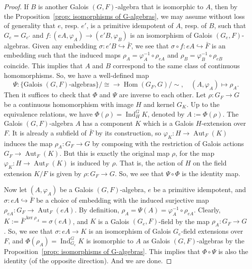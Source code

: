 \documentclass[10pt,a4paper]{amsart}
\begin{document}
\begin{proof}
		If $B$ is another Galois $(G,F)$-algebra that is isomorphic to $A$, then by the Proposition~\ref{prop: isomorphisms of G-algebras}, we may assume without loss of generality that $e$, resp. $e'$, is a primitive idempotent of $A$, resp. of $B$, such that $G_e=G_{e'}$ and $f:(eA,\varphi_{A})\to(e'B,\varphi_{B})$ is an isomorphism of Galois $(G_e,F)$-algebras.
		Given any embedding $\sigma:e'B\hookrightarrow\bar{F}$, we see that $\sigma\circ f:eA\hookrightarrow\bar{F}$ is an embedding such that the induced maps $\rho_A=\varphi_A^{-1}\circ\rho_{eA}$ and $\rho_B=\varphi_B^{-1}\circ\rho_{eB}$ coincide.
		This implies that $A$ and $B$ correspond to the same class of continuous homomorphisms.
		So, we have a well-defined map
		\begin{equation*}
			\Psi:\{\text{Galois }(G,F)\text{-algebras}\}/\cong\to\operatorname{Hom}(G_F,G)/\sim,\quad(A,\varphi_A)\mapsto\rho_A.
		\end{equation*}
		Then it suffices to check that $\Phi$ and $\Psi$ are inverse to each other.
		Let $\rho:G_F\to G$ be a continuous homomorphism with image $H$ and kernel $G_K$.
		Up to the equivalence relations, we have $\Phi(\rho)=\operatorname{Ind}^G_H K$, denoted by $A:=\Phi(\rho)$.
		The Galois $(G,F)$-algebra $A$ has a component $K$ which is a Galois $H$-extension over $F$.
		It is already a subfield of $\bar{F}$ by its construction, so $\varphi_K:H\to\operatorname{Aut}_F(K)$ induces the map $\rho_A:G_F\to G$ by composing with the restriction of Galois actions $G_F\to\operatorname{Aut}_F(K)$.
		But this is exactly the original map $\rho$, for the map $\varphi_K:H\to\operatorname{Aut}_F(K)$ is induced by $\rho$.
		That is, the action of $H$ on the field extension $K/F$ is given by $\rho:G_F\to G$.
		So, we see that $\Psi\circ\Phi$ is the identity map.
		
		Now let $(A,\varphi_A)$ be a Galois $(G,F)$-algebra, $e$ be a primitive idempotent, and $\sigma:eA\hookrightarrow\bar{F}$ be a choice of embedding with the induced surjective map $\rho_{eA}:G_F\to\operatorname{Aut}_F(eA)$.
		By definition, $\rho_A=\Psi(A)=\varphi_A^{-1}\circ\rho_{eA}$.
		Clearly, $K:=\bar{F}^{\ker\rho_A}=\sigma(eA)$, and $K$ is a Galois $(G_e,F)$-field by the map $\rho_A:G_F\to G$.
		So, we see that $\sigma:eA\to K$ is an isomorphism of Galois $G_e$-field extensions over $F$, and $\Phi(\rho_A)=\operatorname{Ind}^G_{G_e}K$ is isomorphic to $A$ as Galois $(G,F)$-algebras by the Proposition~\ref{prop: isomorphisms of G-algebras}.
		This implies that $\Phi\circ\Psi$ is also the identity (of the opposite direction).
		And we are done.
	\end{proof}
\end{document}

